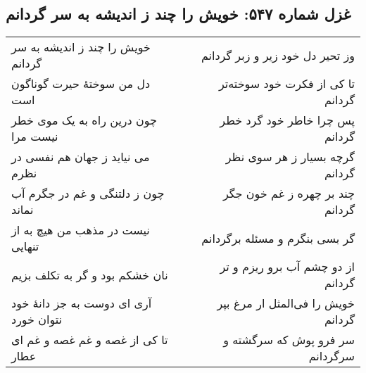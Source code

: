 \begin{center}
\section*{غزل شماره ۵۴۷: خویش را چند ز اندیشه به سر گردانم}
\label{sec:547}
\begin{longtable}{l p{0.5cm} r}
خویش را چند ز اندیشه به سر گردانم
&&
وز تحیر دل خود زیر و زبر گردانم
\\
دل من سوختهٔ حیرت گوناگون است
&&
تا کی از فکرت خود سوخته‌تر گردانم
\\
چون درین راه به یک موی خطر نیست مرا
&&
پس چرا خاطر خود گرد خطر گردانم
\\
می نیاید ز جهان هم نفسی در نظرم
&&
گرچه بسیار ز هر سوی نظر گردانم
\\
چون ز دلتنگی و غم در جگرم آب نماند
&&
چند بر چهره ز غم خون جگر گردانم
\\
نیست در مذهب من هیچ به از تنهایی
&&
گر بسی بنگرم و مسئله برگردانم
\\
نان خشکم بود و گر به تکلف بزیم
&&
از دو چشم آب برو ریزم و تر گردانم
\\
آری ای دوست به جز دانهٔ خود نتوان خورد
&&
خویش را فی‌المثل ار مرغ بپر گردانم
\\
تا کی از غصه و غم غصه و غم ای عطار
&&
سر فرو پوش که سرگشته و سرگردانم
\\
\end{longtable}
\end{center}
